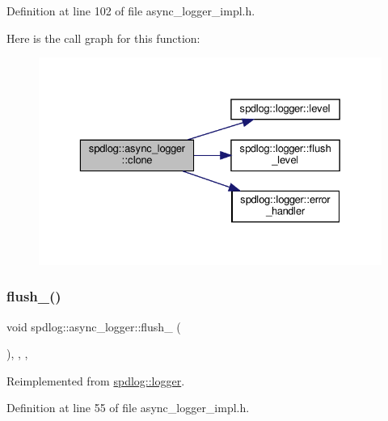 Definition at line 102 of file async\+\_\+logger\+\_\+impl.\+h.

Here is the call graph for this function\+:
\nopagebreak
\begin{figure}[H]
\begin{center}
\leavevmode
\includegraphics[width=329pt]{classspdlog_1_1async__logger_aef60bc96b78ff98a471dc08977d4cb5c_cgraph}
\end{center}
\end{figure}
\mbox{\label{classspdlog_1_1async__logger_ae7eeca32af4d650bc1e2dd06122d0224}} 
\subsubsection{\texorpdfstring{flush\+\_\+()}{flush\_()}}
{\footnotesize\ttfamily void spdlog\+::async\+\_\+logger\+::flush\+\_\+ (\begin{DoxyParamCaption}{ }\end{DoxyParamCaption})\hspace{0.3cm}{\ttfamily [inline]}, {\ttfamily [override]}, {\ttfamily [protected]}, {\ttfamily [virtual]}}



Reimplemented from \hyperlink{classspdlog_1_1logger_a98981b19089a6000fdfa8765af52ef0e}{spdlog\+::logger}.



Definition at line 55 of file async\+\_\+logger\+\_\+impl.\+h.

\mbox{\label{classspdlog_1_1async__logger_aefd367c3266773bfe756d34150705329}} 
